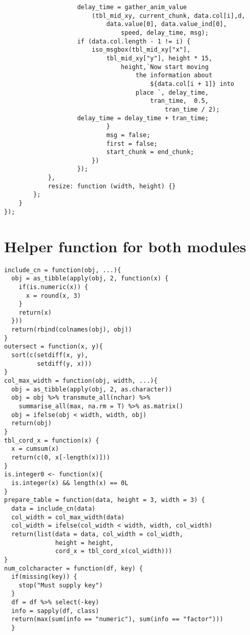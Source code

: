 \begin{lstlisting}
                    delay_time = gather_anim_value
                        (tbl_mid_xy, current_chunk, data.col[i],d, 
                            data.value[0], data.value_ind[0], 
                                speed, delay_time, msg);
                    if (data.col.length - 1 != i) {
                        iso_msgbox(tbl_mid_xy["x"], 
                            tbl_mid_xy["y"], height * 15, 
                                height,`Now start moving 
                                    the information about 
                                        ${data.col[i + 1]} into 
                                    place `, delay_time, 
                                        tran_time,  0.5, 
                                            tran_time / 2);
                    delay_time = delay_time + tran_time;
                            }
                            msg = false;
                            first = false;
                            start_chunk = end_chunk;
                        })
                    });
            },
            resize: function (width, height) {}
        };
    }
});
\end{lstlisting}

\section{Helper function for both modules}

\begin{lstlisting}
include_cn = function(obj, ...){
  obj = as_tibble(apply(obj, 2, function(x) {
    if(is.numeric(x)) {
      x = round(x, 3)
    }
    return(x)
  }))
  return(rbind(colnames(obj), obj))
}
outersect = function(x, y){
  sort(c(setdiff(x, y),
         setdiff(y, x)))
}
col_max_width = function(obj, width, ...){
  obj = as_tibble(apply(obj, 2, as.character))
  obj = obj %>% transmute_all(nchar) %>%
    summarise_all(max, na.rm = T) %>% as.matrix()
  obj = ifelse(obj < width, width, obj)
  return(obj)
}
tbl_cord_x = function(x) {
  x = cumsum(x)
  return(c(0, x[-length(x)]))
}
is.integer0 <- function(x){
  is.integer(x) && length(x) == 0L
}
prepare_table = function(data, height = 3, width = 3) {
  data = include_cn(data)
  col_width = col_max_width(data)
  col_width = ifelse(col_width < width, width, col_width)
  return(list(data = data, col_width = col_width,
              height = height,
              cord_x = tbl_cord_x(col_width)))
}
num_colcharacter = function(df, key) {
  if(missing(key)) {
    stop("Must supply key")
  }
  df = df %>% select(-key)
  info = sapply(df, class)
  return(max(sum(info == "numeric"), sum(info == "factor")))
  }


\end{lstlisting}